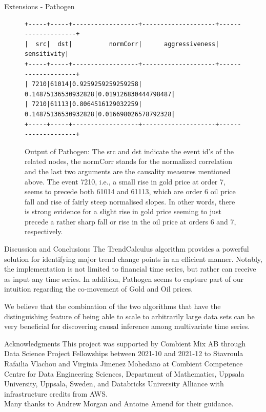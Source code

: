 \documentclass[final]{beamer}
\newlength{\colwidth}
\begin{document}
\begin{frame}[fragile]
\begin{columns}[t]
\begin{column}{\colwidth}
\begin{block}{Extensions - Pathogen}
\begin{itemize}
\begin{itemize}
        \end{itemize}   
    \end{itemize}
\vspace*{-0.3in}
\begin{figure}
\begin{BVerbatim}[fontsize=\small]
+-----+-----+------------------+--------------------+--------------------+
|  src|  dst|          normCorr|      aggressiveness|         sensitivity|
+-----+-----+------------------+--------------------+--------------------+
| 7210|61014|0.9259259259259258| 0.14875136530932828|0.019126830444798487|
| 7210|61113|0.8064516129032259| 0.14875136530932828|0.016698026578792328|
+-----+-----+------------------+--------------------+--------------------+
\end{BVerbatim}
\caption{Output of Pathogen: The src and dst indicate the event id's of the related nodes, the normCorr stands for the normalized correlation and the last two arguments are the causality measures mentioned above. The event 7210, i.e., a small rise in gold price at order 7, seems to precede both 61014 and 61113, which are order 6 oil price fall and rise of fairly steep normalised slopes. In other words, there is strong evidence for a slight rise in gold price seeming to just precede a rather sharp fall or rise in the oil price at orders 6 and 7, respectively.
}
\label{fig:data_pathogen}
\end{figure}
\end{block}

\begin{block}{Discussion and Conclusions}
    The TrendCalculus algorithm provides a  powerful solution for identifying major trend change points in an efficient manner.
    Notably, the implementation is not limited to financial time series, but rather can receive as input any time series. In addition, Pathogen seems to capture part of our intuition regarding the co-movement of Gold and Oil prices.
    
    We believe that the combination of the two algorithms that have the distinguishing feature of being able to scale to arbitrarily large data sets can be very beneficial for discovering causal inference among multivariate time series.  
\end{block}



\begin{block}{Acknowledgments}
\fontsize{20}{10}\selectfont This project was supported by Combient Mix AB through Data Science Project Fellowships between 2021-10 and 2021-12 to Stavroula Rafailia Vlachou and Virginia Jimenez Mohedano at Combient Competence Centre for Data Engineering Sciences, Department of Mathematics, Uppsala University, Uppsala, Sweden, and Databricks University Alliance with infrastructure credits from AWS.\\
Many thanks to Andrew Morgan and Antoine Amend for their guidance.
\end{block}



\end{column}
\end{columns}
\end{frame}
\end{document}
